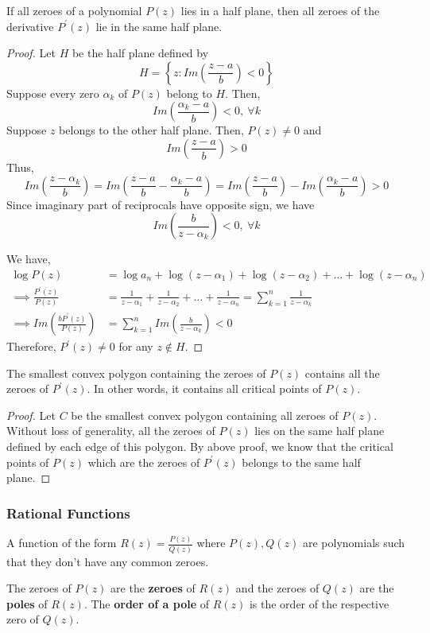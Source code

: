 \begin{theorem}[Lucas]
	If all zeroes of a polynomial $P(z)$ lies in a half plane, then all zeroes of the derivative $P^\prime(z)$ lie in the same half plane.
\end{theorem}
\begin{proof}
	Let $H$ be the half plane defined by
	\[ H = \left\{ z : Im{\left(\frac{z-a}{b}\right)}<0\right\} \]
	Suppose every zero $\alpha_k$ of $P(z)$ belong to $H$.
	Then,
	\[ Im\left(\frac{\alpha_k-a}{b}\right) < 0,\ \forall k \]
	Suppose $z$ belongs to the other half plane.
	Then, $P(z) \ne 0$ and
	\[ Im\left(\frac{z-a}{b}\right) > 0 \]
	Thus,
	\[ Im\left(\frac{z-\alpha_k}{b}\right) = Im\left(\frac{z-a}{b}-\frac{\alpha_k-a}{b}\right) = Im\left(\frac{z-a}{b}\right)-Im\left(\frac{\alpha_k-a}{b}\right) > 0 \]
	Since imaginary part of reciprocals have opposite sign, we have
	\[ Im\left(\frac{b}{z-\alpha_k}\right) < 0,\ \forall k \]

	We have,
	\begin{align*}
		\log P(z) 
			& = \log a_n + \log (z-\alpha_1) + \log (z-\alpha_2) + \dots + \log (z-\alpha_n) \\
		\implies \frac{P^\prime(z)}{P(z)} 
			& = \frac{1}{z-\alpha_1}+\frac{1}{z-\alpha_2}+\dots+\frac{1}{z-\alpha_n} = \sum_{k=1}^n \frac{1}{z-\alpha_k} \\
		\implies Im\left(\frac{bP^\prime(z)}{P(z)}\right)
			& = \sum_{k=1}^n Im\left(\frac{b}{z-\alpha_k}\right) < 0
\end{align*}
	 Therefore, $P^\prime(z) \ne 0$ for any $z \notin H$.
\end{proof}
\begin{commentary}
\begin{theorem}[Lucas]
	The smallest convex polygon containing the zeroes of $P(z)$ contains all the zeroes of $P^\prime(z)$. In other words, it contains all critical points of $P(z)$.
\end{theorem}
\begin{proof}
	Let $C$ be the smallest convex polygon containing all zeroes of $P(z)$.
	Without loss of generality, all the zeroes of $P(z)$ lies on the same half plane defined by each edge of this polygon.
	By above proof, we know that the critical points of $P(z)$ which are the zeroes of $P^\prime(z)$ belongs to the same half plane.
\end{proof}
\end{commentary}

\subsubsection{Rational Functions}
\begin{definition}
	A function of the form $R(z) = \frac{P(z)}{Q(z)}$ where $P(z),Q(z)$ are polynomials such that they don't have any common zeroes.
\end{definition}
The zeroes of $P(z)$ are the \textbf{zeroes} of $R(z)$ and the zeroes of $Q(z)$ are the \textbf{poles} of $R(z)$.
The \textbf{order of a pole} of $R(z)$ is the order of the respective zero of $Q(z)$.


